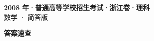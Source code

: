 \documentclass[zihao=-4, a4paper]{ctexart}
\begin{document}
\begin{center}
  {\Large\bfseries 2008 年·普通高等学校招生考试·浙江卷·理科}\\[4pt]
  {\large 数学 · 简答版}
\end{center}
\medskip
{}

\clearpage
{}
\begin{center}{\Large\bfseries 答案速查}\end{center}
\medskip

\end{document}

